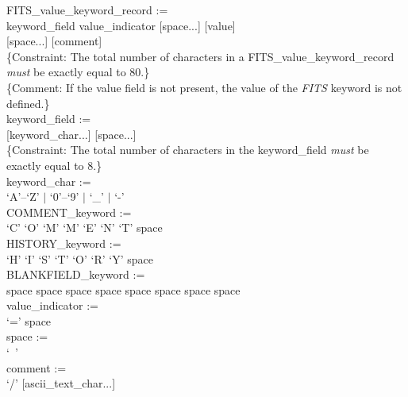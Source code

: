 \documentclass[onecolumn]{aa}
\begin{document}
FITS\_value\_keyword\_record :=  \\ \null \hspace{0.5in}
	keyword\_field value\_indicator [space...] [value] \\ \null \hspace{1.0in}
	[space...] [comment]  \\
\{Constraint: The total number of characters in a FITS\_value\_keyword\_record 
{\em must} be exactly equal to 80.\} \\
\{Comment: If the value field is not present, the value of the 
{\em FITS\/} keyword is not defined.\} \\

keyword\_field :=  \\ \null \hspace{0.5in}
	[keyword\_char...] [space...] \\
\{Constraint: The total number of characters in the keyword\_field {\em must} 
be exactly equal to 8.\} \\

keyword\_char :=  \\ \null \hspace{0.5in}
	`A'--`Z' $|$ `0'--`9' $|$ `\_' $|$ `-' \\

COMMENT\_keyword :=  \\ \null \hspace{0.5in}
	`C' `O' `M' `M' `E' `N' `T' space \\

HISTORY\_keyword :=  \\ \null \hspace{0.5in}
	`H' `I' `S' `T' `O' `R' `Y' space \\

BLANKFIELD\_keyword :=  \\ \null \hspace{0.5in}
	space space space space space space space space \\

value\_indicator :=  \\ \null \hspace{0.5in}
	`=' space \\

space :=   \\ \null \hspace{0.5in}
	`\verb*+ +' \\

comment :=  \\ \null \hspace{0.5in}
	`/' [ascii\_text\_char...] \\
\end{document}
